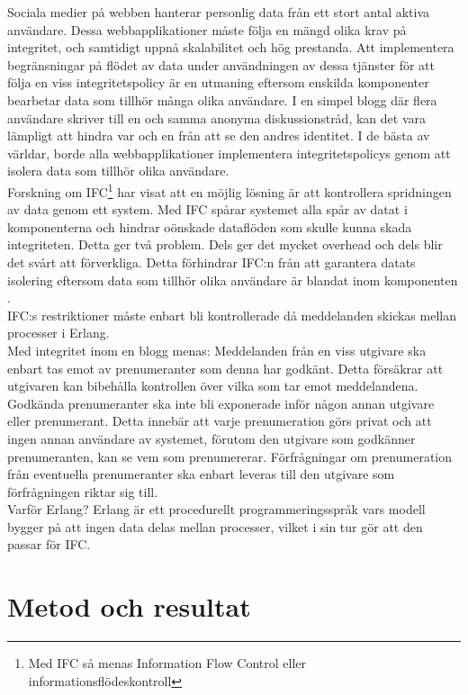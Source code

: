 \documentclass[12pt]{article}
\begin{document}
Sociala medier på webben hanterar personlig data från ett stort antal aktiva användare. Dessa webbapplikationer måste följa en mängd olika krav på integritet, och samtidigt uppnå skalabilitet och hög prestanda. Att implementera begränsningar på flödet av data under användningen av dessa tjänster för att följa en viss integritetspolicy är en utmaning eftersom enskilda komponenter bearbetar data som tillhör många olika användare. I en simpel blogg där flera användare skriver till en och samma anonyma diskussionstråd, kan det vara lämpligt att hindra var och en från att se den andres identitet. I de bästa av världar, borde alla webbapplikationer implementera integritetspolicys genom att isolera data som tillhör olika användare. \cite{IFC}	
\\
Forskning om IFC\footnote{Med IFC så menas Information Flow Control eller informationsflödeskontroll} har visat att en möjlig lösning är att kontrollera spridningen av data genom ett system. Med IFC spårar systemet alla spår av datat i komponenterna och hindrar oönskade dataflöden som skulle kunna skada integriteten. Detta ger två problem. Dels ger det mycket overhead och dels blir det svårt att förverkliga. Detta förhindrar IFC:n från att garantera datats isolering eftersom data som tillhör olika användare är blandat inom komponenten \cite{IFC}. 
\\
IFC:s restriktioner måste enbart bli kontrollerade då meddelanden skickas mellan processer i Erlang. \cite{IFC}
\\
Med integritet inom en blogg menas:
Meddelanden från en viss utgivare ska enbart tas emot av prenumeranter som denna har godkänt. Detta försäkrar att utgivaren kan bibehålla kontrollen över vilka som tar emot meddelandena.
Godkända prenumeranter ska inte bli exponerade inför någon annan utgivare eller prenumerant. Detta innebär att varje prenumeration görs privat och att ingen annan användare av systemet, förutom den utgivare som godkänner prenumeranten, kan se vem som prenumererar.
Förfrågningar om prenumeration från eventuella prenumeranter ska enbart leveras till den utgivare som förfrågningen riktar sig till. \cite{IFC}
\\
Varför Erlang? Erlang är ett procedurellt programmeringsspråk vars modell bygger på att ingen data delas mellan processer, vilket i sin tur gör att den passar för IFC. \cite{IFC}



 
\section{Metod och 	resultat }	
\end{document}
